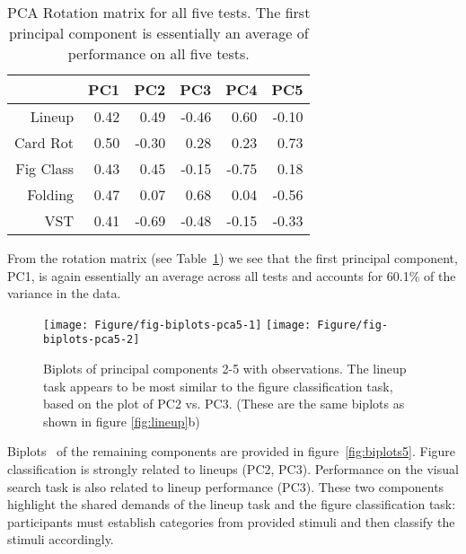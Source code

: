 \documentclass[journal]{vgtc}\usepackage[]{graphicx}\usepackage[]{color}
\newenvironment{knitrout}{}{} %
\begin{document}
\begin{table}[ht]
\centering
\caption{PCA Rotation matrix for all five tests. The first principal component is essentially an average of performance on all five tests. \label{tab:PCArotation5}} 
\begin{tabular}{rrrrrr}
  \hline
 & PC1 & PC2 & PC3 & PC4 & PC5 \\ 
  \hline
Lineup & 0.42 & 0.49 & -0.46 & 0.60 & -0.10 \\ 
  Card Rot & 0.50 & -0.30 & 0.28 & 0.23 & 0.73 \\ 
  Fig Class & 0.43 & 0.45 & -0.15 & -0.75 & 0.18 \\ 
  Folding & 0.47 & 0.07 & 0.68 & 0.04 & -0.56 \\ 
  VST & 0.41 & -0.69 & -0.48 & -0.15 & -0.33 \\ 
   \hline
\end{tabular}
\end{table}

From the rotation matrix (see Table~\ref{tab:PCArotation5}) we see that  
the first principal component, PC1, is again essentially an average across all tests and accounts for 60.1\% of the variance in the data. 


\begin{knitrout}
\color{fgcolor}\begin{figure}

{\centering \texttt{[image: Figure/fig-biplots-pca5-1]} 
\texttt{[image: Figure/fig-biplots-pca5-2]} 

}

\caption{Biplots of principal components 2-5 with observations. The lineup task appears to be most similar to the figure classification task, based on the plot of PC2 vs. PC3. (These are the same biplots as shown in figure \ref{fig:lineup}b)  \label{fig:biplots5}}\label{fig:biplots-pca5}
\end{figure}


\end{knitrout}
Biplots~\cite{biplots:gabriel} of the remaining components are provided in figure~\ref{fig:biplots5}. Figure classification is strongly related to lineups (PC2, PC3). Performance on the visual search task  is also related to lineup performance (PC3). These two components highlight the shared demands of the lineup task and the figure classification task: participants must establish categories from provided stimuli and then classify the stimuli accordingly. 
\end{document}
